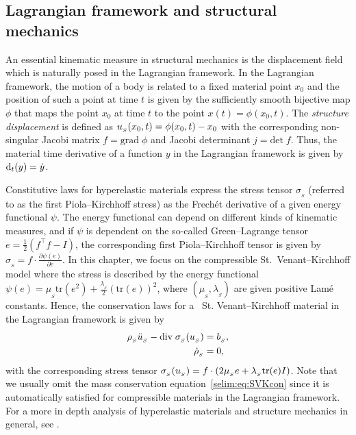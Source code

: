 \subsection{ Lagrangian framework and structural mechanics}

An essential kinematic measure in structural mechanics is the
displacement field which is naturally posed in the Lagrangian
framework.  In the Lagrangian framework, the motion of a body is
related to a fixed material point $x_0$ and the position of
such a point at time $t$ is given by the sufficiently smooth bijective
map $\phi$ that maps the point $x_0$ at time $t$ to the point $x(t)=
\phi(x_0,t)$. The \emph{structure displacement} is defined as
$u_{_{S}}(x_0,t) = \phi(x_0, t) - x_0$ with the corresponding non-singular
Jacobi matrix $f = \textrm{grad}\;\phi$ and Jacobi determinant $j =
\textrm{det}\; f$. Thus, the material time derivative of a function $y$
in the Lagrangian framework is given by $\textrm{d}_t(y) = \dot{y}$.

Constitutive laws for hyperelastic materials express the stress tensor
$\sigma_{_{S}}$ (referred to as the first Piola--Kirchhoff stress)
as the Frech\'{e}t derivative of a given energy functional $\psi$.
The energy functional can depend on different kinds of kinematic measures,
and if $\psi$ is dependent on the so-called Green--Lagrange tensor $e=
\tfrac{1}{2}(f^{\top}f -I)$, the corresponding first Piola--Kirchhoff
tensor is given by $\sigma_{_{S}} = f\cdot\frac{\partial \psi(e)}{\partial
e}$. In this chapter, we focus on the compressible St.~Venant--Kirchhoff
model where the stress is described by the energy functional $\psi(e) =
\mu_{_{S}}\textrm{tr}(e^2) + \frac{\lambda_{_{S}}}{2}(\textrm{tr}(e))^2$,
where $(\mu_{_{S}},\lambda_{_{S}})$ are given positive Lam\'{e}
constants. Hence, the conservation laws for a ~St. Venant--Kirchhoff
material in the Lagrangian framework is given by
\begin{align}
\label{selim:eq:SVKmom}
\rho_{_{S}} \ddot{u}_{_{S}} - \textrm{div}\;\sigma_{_{S}}(u_{_{S}}) &= b_{_{S}},
\\
\label{selim:eq:SVKcon}
\dot{\rho}_{_{S}}&=0,
\end{align}
with the corresponding stress tensor $\sigma_{_{S}}(u_{_{S}}) = f\cdot(2\mu_{_{S}}e
+ \lambda_{_{S}} \textrm{tr}(e)I)$.  Note that we usually omit the mass
conservation equation~\eqref{selim:eq:SVKcon} since it is automatically
satisfied for compressible materials in the Lagrangian framework.  For a
more in depth analysis of hyperelastic materials and structure mechanics
in general, see \citet{Gurtin1981,Holzapfel2000}.

